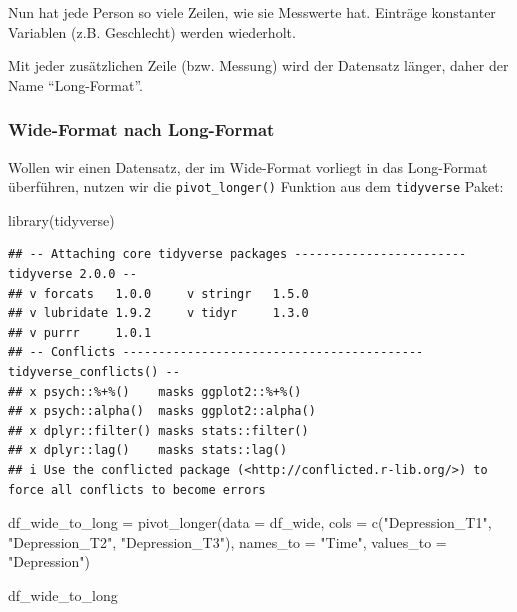 \documentclass[
]{book}
\newenvironment{Shaded}{\begin{snugshade}}{\end{snugshade}}
\newcommand{\AttributeTok}[1]{\textcolor[rgb]{0.77,0.63,0.00}{#1}}
\newcommand{\FunctionTok}[1]{\textcolor[rgb]{0.00,0.00,0.00}{#1}}
\newcommand{\NormalTok}[1]{#1}
\newcommand{\OtherTok}[1]{\textcolor[rgb]{0.56,0.35,0.01}{#1}}
\newcommand{\StringTok}[1]{\textcolor[rgb]{0.31,0.60,0.02}{#1}}
\begin{document}
Nun hat jede Person so viele Zeilen, wie sie Messwerte hat. Einträge konstanter Variablen (z.B. Geschlecht) werden wiederholt.

Mit jeder zusätzlichen Zeile (bzw. Messung) wird der Datensatz länger, daher der Name ``Long-Format''.

\hypertarget{wide-format-nach-long-format}{%
\subsubsection{Wide-Format nach Long-Format}\label{wide-format-nach-long-format}}

Wollen wir einen Datensatz, der im Wide-Format vorliegt in das Long-Format überführen, nutzen wir die \texttt{pivot\_longer()} Funktion aus dem \texttt{tidyverse} Paket:

\begin{Shaded}
\begin{Highlighting}[]
\FunctionTok{library}\NormalTok{(tidyverse)}
\end{Highlighting}
\end{Shaded}

\begin{verbatim}
## -- Attaching core tidyverse packages ------------------------ tidyverse 2.0.0 --
## v forcats   1.0.0     v stringr   1.5.0
## v lubridate 1.9.2     v tidyr     1.3.0
## v purrr     1.0.1     
## -- Conflicts ------------------------------------------ tidyverse_conflicts() --
## x psych::%+%()    masks ggplot2::%+%()
## x psych::alpha()  masks ggplot2::alpha()
## x dplyr::filter() masks stats::filter()
## x dplyr::lag()    masks stats::lag()
## i Use the conflicted package (<http://conflicted.r-lib.org/>) to force all conflicts to become errors
\end{verbatim}

\begin{Shaded}
\begin{Highlighting}[]
\NormalTok{df\_wide\_to\_long }\OtherTok{=} \FunctionTok{pivot\_longer}\NormalTok{(}\AttributeTok{data =}\NormalTok{ df\_wide, }
                               \AttributeTok{cols =} \FunctionTok{c}\NormalTok{(}\StringTok{"Depression\_T1"}\NormalTok{, }\StringTok{"Depression\_T2"}\NormalTok{, }\StringTok{"Depression\_T3"}\NormalTok{), }
                               \AttributeTok{names\_to =} \StringTok{"Time"}\NormalTok{, }
                               \AttributeTok{values\_to =} \StringTok{"Depression"}\NormalTok{)}

\NormalTok{df\_wide\_to\_long}
\end{Highlighting}
\end{Shaded}
\end{document}
